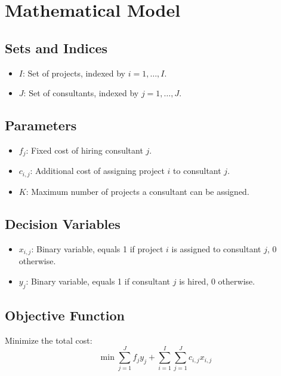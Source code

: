 \documentclass{article}
\begin{document}
\section*{Mathematical Model}

\subsection*{Sets and Indices}
\begin{itemize}
    \item \( I \): Set of projects, indexed by \( i = 1, \ldots, I \).
    \item \( J \): Set of consultants, indexed by \( j = 1, \ldots, J \).
\end{itemize}

\subsection*{Parameters}
\begin{itemize}
    \item \( f_j \): Fixed cost of hiring consultant \( j \).
    \item \( c_{i,j} \): Additional cost of assigning project \( i \) to consultant \( j \).
    \item \( K \): Maximum number of projects a consultant can be assigned.
\end{itemize}

\subsection*{Decision Variables}
\begin{itemize}
    \item \( x_{i,j} \): Binary variable, equals 1 if project \( i \) is assigned to consultant \( j \), 0 otherwise.
    \item \( y_j \): Binary variable, equals 1 if consultant \( j \) is hired, 0 otherwise.
\end{itemize}

\subsection*{Objective Function}
Minimize the total cost:
\[
\min \sum_{j=1}^{J} f_j y_j + \sum_{i=1}^{I} \sum_{j=1}^{J} c_{i,j} x_{i,j}
\]
\end{document}
